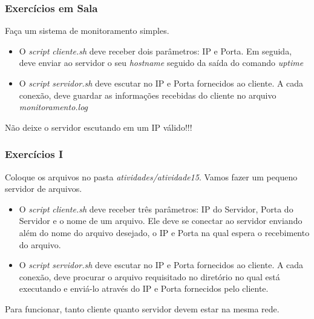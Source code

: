 \documentclass{beamer}
\begin{document}
   \begin{frame}
      \frametitle{Exercícios em Sala}
      Faça um sistema de monitoramento simples.
      \begin{itemize}
         \item O \textit{script} \textit{cliente.sh} deve receber dois parâmetros: IP e Porta. Em seguida, deve enviar ao servidor o seu \textit{hostname} seguido da saída do comando \textit{uptime}
	 \item O \textit{script} \textit{servidor.sh} deve escutar no IP e Porta fornecidos ao cliente. A cada conexão, deve guardar as informações recebidas do cliente no arquivo \textit{monitoramento.log}
     \end{itemize}
     Não deixe o servidor escutando em um IP válido!!!
   \end{frame}

   \begin{frame}
      \frametitle{Exercícios I}
      Coloque os arquivos no pasta \textit{atividades/atividade15}. Vamos fazer um pequeno servidor de arquivos.
      \begin{itemize}
         \item O \textit{script} \textit{cliente.sh} deve receber três parâmetros: IP do Servidor, Porta do Servidor e o nome de um arquivo. Ele deve se conectar ao servidor enviando além do nome do arquivo desejado, o IP e Porta na qual espera o recebimento do arquivo.  
	 \item O \textit{script} \textit{servidor.sh} deve escutar no IP e Porta fornecidos ao cliente. A cada conexão, deve procurar o arquivo requisitado no diretório no qual está executando e enviá-lo através do IP e Porta fornecidos pelo cliente.
     \end{itemize}
     Para funcionar, tanto cliente quanto servidor devem estar na mesma rede.
   \end{frame}
\end{document}
